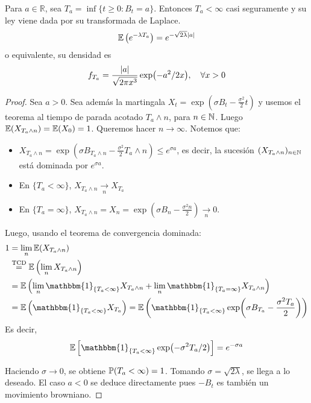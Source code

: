 \begin{proposition}
        Para $a \in \mathbb{R}$, sea $T_a = \inf \{ t \ge 0: B_t = a \}$. Entonces $T_a < \infty$ casi seguramente 
        y su ley viene dada por su transformada de Laplace.
        \begin{equation*}
                \E \left( e^{-\lambda T_{a}} \right)  = e^{-\sqrt{2\lambda} \abs{a} }
        \end{equation*}
        o equivalente, su densidad es 
        \begin{equation*}
                f_{T_{a}} = \frac{\abs{a}}{\sqrt{ 2 \pi x^3}} \exp({{-a^2}/{2x}}), ~ ~ ~ \forall x > 0
        \end{equation*}
\end{proposition}
\begin{proof}
\gris
Sea $a>0$. Sea además la martingala $X_t = \exp(\sigma B_t - \frac{\sigma^2}{2}t)$ y usemos el  
teorema al tiempo de parada acotado $T_a \wedge n$, para $n \in \N$. Luego $\E (X_{T_a \wedge n}) 
= \E(X_0) = 1$. Queremos  hacer $n \to \infty$. Notemos que:
\begin{itemize}
\item $X_{T_{a} \wedge n} = \exp\left(\sigma B_{T_{a} \wedge n} - \frac{\sigma^{2}}{2} 
        T_a \wedge n \right)  \le e^{\sigma a}$, es decir, la sucesión $(X_{T_a \wedge n})_{n \in \N}$
        está dominada por $e^{\sigma a}$.
\item En $\{T_a < \infty \}$, $X_{T_a \wedge n} \xrightarrow[n]{} X_{T_a}$
\item En $\{T_a = \infty \}$, $X_{T_a \wedge n} = X_n = \exp\left( \sigma B_n - \frac{\sigma^2 n}{2}
        \right)  \xrightarrow[n]{} 0$.
\end{itemize}
Luego, usando el teorema de convergencia dominada: 
\begin{align*}
        1 
        &= \lim_n \E(X_{T_{a} \wedge n}) \\ 
        &\stackrel{\text{TCD}}{=} \E\left(\lim_n X_{T_a \wedge n} \right)\\
        &= \E \left( \lim_n \mathbbm{1}_{\{T_a < \infty\}} X_{T_a \wedge n} + 
        \lim_n \mathbbm{1}_{\{T_{a} = \infty\}} X_{T_a \wedge n} \right)\\
        &= \E \left( \mathbbm{1}_{\{ T_a < \infty \}}  X_{T_a}  \right) 
            = \E \left( \mathbbm{1}_{\{T_a < \infty \}} \exp( \sigma B_{T_a} 
                - \frac{\sigma^2 T_a}{2}) \right)
\end{align*}
Es decir, 
\begin{equation*}
        \E \left[ \mathbbm{1}_{\{T_a < \infty \}} \exp(-\sigma^2 T_a / 2) \right] = e^{-\sigma a}
\end{equation*}

Haciendo $\sigma \to 0$, se obtiene $\P(T_a < \infty) = 1$. Tomando $\sigma = \sqrt{2\lambda}$,
se llega a lo deseado. El caso $a < 0$ se deduce directamente pues $-B_t$ es también un movimiento
browniano.\findem
\negro
\end{proof}


